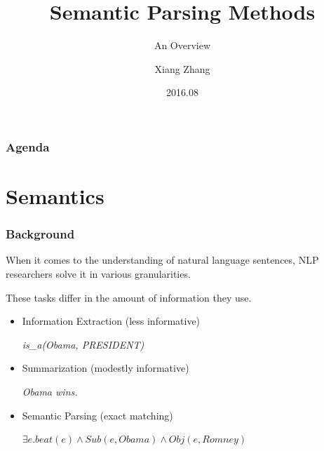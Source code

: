 \documentclass{beamer}
\title[]{Semantic Parsing Methods}
\subtitle{An Overview}
\author {Xiang Zhang}
\date{2016.08}
\begin{document}
\frame{\titlepage}

\begin{frame}
\frametitle{Agenda}
\tableofcontents[hideallsubsections]
\end{frame}


\section{Semantics}

\begin{frame}
    \frametitle{Background}

    When it comes to the understanding of natural language sentences, NLP researchers 
    solve it in various granularities.

    These tasks differ in the amount of information they use.

    \begin{itemize}
        \item <1-> Information Extraction (less informative) \\
            \begin{center}
                \emph{is\_a(Obama, PRESIDENT)}
            \end{center}

        \item <2-> Summarization (modestly informative) \\
            \begin{center}
            \emph{Obama wins.}
            \end{center}

        \item <3-> Semantic Parsing (exact matching) \\
            \begin{center}
            $\exists e . beat(e) \wedge Sub(e, Obama) \wedge Obj(e, Romney)$
            \end{center}
            
    \end{itemize}

\end{frame}
\end{document}
